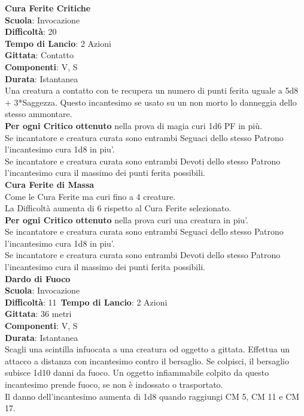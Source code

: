 \begin{multicols}{2}
\medskip\textbf{Cura Ferite Critiche}\\
\textbf{Scuola}: Invocazione\\
\textbf{Difficoltà}: 20 \\
\textbf{Tempo di Lancio}: 2 Azioni\\
\textbf{Gittata}: Contatto\\
\textbf{Componenti}: V, S\\
\textbf{Durata}: Istantanea\\
Una creatura a contatto con te recupera un numero di punti ferita uguale a 5d8 + 3*Saggezza. Questo incantesimo se usato su un non morto lo danneggia dello stesso ammontare.\\
\textbf{Per ogni Critico ottenuto} nella prova di magia curi 1d6 PF in più.\\
Se incantatore e creatura curata sono entrambi Seguaci dello stesso Patrono l'incantesimo cura 1d8 in piu'.\\
Se incantatore e creatura curata sono entrambi Devoti dello stesso Patrono l'incantesimo cura il massimo dei punti ferita possibili.\\

\medskip\textbf{Cura Ferite di Massa}\\
Come le Cura Ferite ma curi fino a 4 creature.\\
La Difficoltà aumenta di 6 rispetto al Cura Ferite selezionato.\\
\textbf{Per ogni Critico ottenuto} nella prova curi una creatura in piu'.\\
Se incantatore e creatura curata sono entrambi Seguaci dello stesso Patrono l'incantesimo cura 1d8 in piu'.\\
Se incantatore e creatura curata sono entrambi Devoti dello stesso Patrono l'incantesimo cura il massimo dei punti ferita possibili.\\

\medskip\textbf{Dardo di Fuoco}\\
\textbf{Scuola}: Invocazione\\
\textbf{Difficoltà}: 11\
\textbf{Tempo di Lancio}: 2 Azioni\\
\textbf{Gittata}: 36 metri\\
\textbf{Componenti}: V, S\\
\textbf{Durata}: Istantanea\\
Scagli una scintilla infuocata a una creatura od oggetto a gittata. Effettua un attacco a distanza con incantesimo contro il bersaglio. Se colpisci, il bersaglio subisce 1d10 danni da fuoco. Un oggetto infiammabile colpito da questo incantesimo prende fuoco, se non è indossato o trasportato.\\
Il danno dell'incantesimo aumenta di 1d8 quando raggiungi CM 5, CM 11 e CM 17.


\end{multicols}
